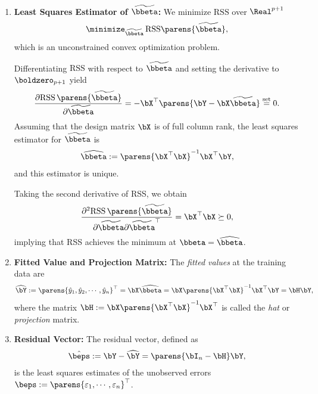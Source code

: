 \documentclass[12pt]{article}
\begin{document}
\begin{enumerate}[label=\textbf{\arabic*.}]
	\item \textbf{Least Squares Estimator of $\widetilde{\bbeta}$:} We minimize $\mathrm{RSS}$ over $\Real^{p+1}$ 
	\begin{align*}
		\minimize_{\widetilde{\bbeta}} \, \mathrm{RSS} \parens{\widetilde{\bbeta}}, 
	\end{align*}
	which is an unconstrained convex optimization problem. 
	
	Differentiating $\mathrm{RSS}$ with respect to $\widetilde{\bbeta}$ and setting the derivative to $\boldzero_{p+1}$ yield 
	\begin{equation}\label{eq-normal-eq}
		\frac{\partial \mathrm{RSS} \, \parens{\widetilde{\bbeta}}}{\partial \widetilde{\bbeta}} = - \bX^\top \parens{\bY - \bX \widetilde{\bbeta}} \stackrel{\text{set}}{=} 0. 
	\end{equation} 
	Assuming that the design matrix $\bX$ is of full column rank, the least squares estimator for $\widetilde{\bbeta}$ is 
	\begin{align*}
		\widehat{\bbeta} := \parens{\bX^\top \bX}^{-1} \bX^\top \bY, 
	\end{align*}
	and this estimator is unique. 
	
	Taking the second derivative of RSS, we obtain 
	\begin{align*}
		\frac{\partial^2 \mathrm{RSS} \, \parens{\widetilde{\bbeta}}}{\partial \widetilde{\bbeta} \partial \widetilde{\bbeta}^\top} = \bX^\top \bX \succeq 0, 
	\end{align*}
	implying that RSS achieves the minimum at $\bbeta = \widehat{\bbeta}$. 
	
	\item \textbf{Fitted Value and Projection Matrix:} The \textit{fitted values} at the training data are 
	\begin{align*}
		\widehat{\bY} := \parens{\hat{y}_1, \hat{y}_2, \cdots, \hat{y}_n}^\top = \bX \widehat{\bbeta} = \bX \parens{\bX^\top \bX}^{-1} \bX^\top \bY = \bH \bY, 
	\end{align*}
	where the matrix $\bH := \bX \parens{\bX^\top \bX}^{-1} \bX^\top$ is called the \textit{hat} or \textit{projection} matrix. 
	
	\item \textbf{Residual Vector:} The residual vector, defined as 
	\begin{align*}
		\hat{\beps} := \bY - \widehat{\bY} = \parens{\bI_n - \bH} \bY, 
	\end{align*}
	is the least squares estimates of the unobserved errors $\beps := \parens{\varepsilon_1, \cdots, \varepsilon_n}^\top$. 
	

\end{enumerate}
\end{document}
